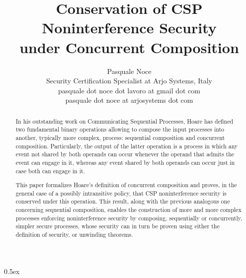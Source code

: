 \documentclass[11pt,a4paper]{article}
\begin{document}
\title{Conservation of CSP Noninterference Security\\under Concurrent Composition}
\author{Pasquale Noce\\Security Certification Specialist at Arjo Systems, Italy\\pasquale dot noce dot lavoro at gmail dot com\\pasquale dot noce at arjosystems dot com}
\maketitle

\begin{abstract}
In his outstanding work on Communicating Sequential Processes, Hoare has defined
two fundamental binary operations allowing to compose the input processes into
another, typically more complex, process: sequential composition and concurrent
composition. Particularly, the output of the latter operation is a process in
which any event not shared by both operands can occur whenever the operand that
admits the event can engage in it, whereas any event shared by both operands can
occur just in case both can engage in it.

This paper formalizes Hoare's definition of concurrent composition and proves,
in the general case of a possibly intransitive policy, that CSP noninterference
security is conserved under this operation. This result, along with the previous
analogous one concerning sequential composition, enables the construction of
more and more complex processes enforcing noninterference security by composing,
sequentially or concurrently, simpler secure processes, whose security can in
turn be proven using either the definition of security, or unwinding theorems.
\end{abstract}

\tableofcontents

\parindent 0pt\parskip 0.5ex





\end{document}
